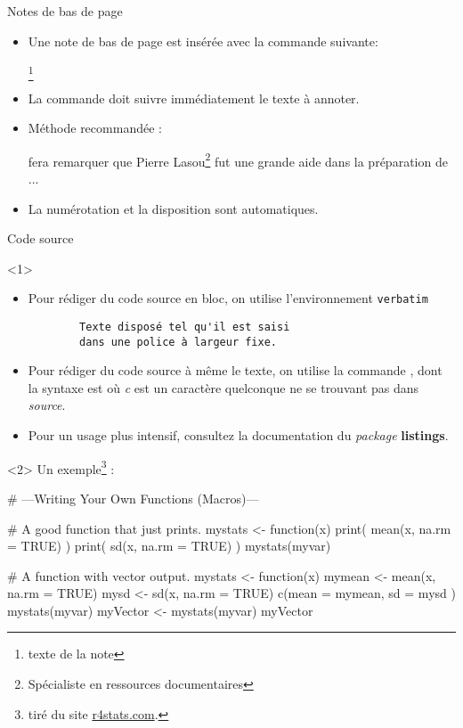 \begin{frame}[fragile,c]{Notes de bas de page}
	\begin{itemize}
		\item Une note de bas de page est insérée avec la commande suivante:
\begin{codesource}
	\footnote{texte de la note}
\end{codesource}
		\item La commande doit suivre immédiatement le texte à annoter.
		\item Méthode recommandée :
\begin{codesource}
	fera remarquer que Pierre Lasou\footnote{%
	Spécialiste en ressources documentaires} %
	fut une grande aide dans la préparation de ...
\end{codesource}
		\item La numérotation et la disposition sont automatiques.
	\end{itemize}
\end{frame}

\begin{frame}[fragile,c]{Code source}
	\begin{onlyenv}
		\begin{itemize}
			\item Pour rédiger du code source en bloc, on utilise l'environnement \texttt{verbatim}
\begin{codesource}
	\begin{verbatim}
		Texte disposé tel qu'il est saisi
		dans une police à largeur fixe.
	\end{verbatim}
\end{codesource}
			\item Pour rédiger du code source à même le texte, on utilise la commande , dont la
			syntaxe est  où \emph{c} est un caractère quelconque ne se trouvant pas dans \emph{source}.
			\item Pour un usage plus intensif, consultez la documentation du \emph{package} \textbf{listings}.
		\end{itemize}
	\end{onlyenv}

	\begin{onlyenv}
	Un exemple\footnote{tiré du site \href{http://r4stats.com/examples/programming/}{r4stats.com}.} :
\begin{codesource}
	# ---Writing Your Own Functions (Macros)---
	
	# A good function that just prints.
	mystats <- function(x) {
		print( mean(x, na.rm = TRUE) )
		print(   sd(x, na.rm = TRUE) )
	}
	mystats(myvar)
	
	# A function with vector output.
	mystats  <- function(x) {
		mymean <- mean(x, na.rm = TRUE)
		mysd   <-   sd(x, na.rm = TRUE)
		c(mean = mymean, sd = mysd )
	}
	mystats(myvar)
	myVector <- mystats(myvar)
	myVector
\end{codesource}
	\end{onlyenv}
\end{frame}